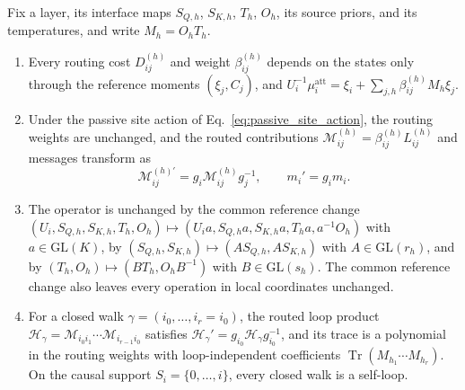 \documentclass[twoside,11pt]{article}
\begin{document}
\begin{theorem}
\label{thm:reference_moments}
Fix a layer, its interface maps $S_{Q,h}$, $S_{K,h}$, $T_h$, $O_h$, its source priors, and its temperatures, and write $M_h=O_hT_h$.
\begin{enumerate}
\item Every routing cost $D_{ij}^{(h)}$ and weight $\beta_{ij}^{(h)}$ depends on the states only through the reference moments $(\xi_j,C_j)$, and $U_i^{-1}\mu_i^{\mathrm{att}}=\xi_i+\sum_{j,h}\beta_{ij}^{(h)}M_h\xi_j$.
\item Under the passive site action of Eq.~\eqref{eq:passive_site_action}, the routing weights are unchanged, and the routed contributions $\mathcal M_{ij}^{(h)}=\beta_{ij}^{(h)}L_{ij}^{(h)}$ and messages transform as
\begin{equation}
\mathcal M_{ij}^{(h)\prime}=g_i\mathcal M_{ij}^{(h)}g_j^{-1},
\qquad m_i'=g_i m_i.
\label{eq:relational_covariance}
\end{equation}
\item The operator is unchanged by the common reference change $(U_i,S_{Q,h},S_{K,h},T_h,O_h)\mapsto(U_ia,S_{Q,h}a,S_{K,h}a,T_ha,a^{-1}O_h)$ with $a\in\mathrm{GL}(K)$, by $(S_{Q,h},S_{K,h})\mapsto(AS_{Q,h},AS_{K,h})$ with $A\in\mathrm{GL}(r_h)$, and by $(T_h,O_h)\mapsto(BT_h,O_hB^{-1})$ with $B\in\mathrm{GL}(s_h)$. The common reference change also leaves every operation in local coordinates unchanged.
\item For a closed walk $\gamma=(i_0,\ldots,i_r=i_0)$, the routed loop product $\mathcal H_\gamma=\mathcal M_{i_0i_1}\cdots\mathcal M_{i_{r-1}i_0}$ satisfies $\mathcal H_\gamma'=g_{i_0}\mathcal H_\gamma g_{i_0}^{-1}$, and its trace is a polynomial in the routing weights with loop-independent coefficients $\operatorname{Tr}(M_{h_1}\cdots M_{h_r})$. On the causal support $S_i=\{0,\ldots,i\}$, every closed walk is a self-loop.
\end{enumerate}
\end{theorem}
\end{document}
